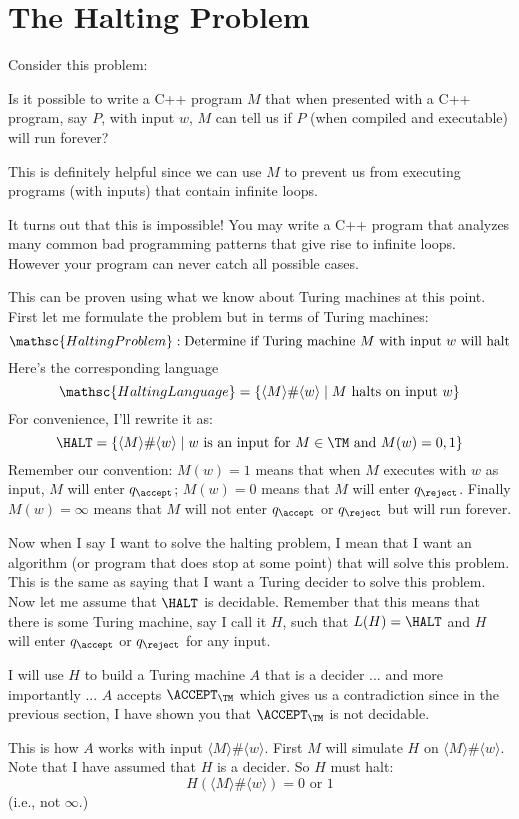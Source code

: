 \section{The Halting Problem}

Consider this problem:

Is it possible to write a C++ program $M$ that when presented with 
a C++ program, say $P$, with input $w$, $M$ can tell us if $P$
(when compiled and executable) will run forever?

This is definitely helpful since we can use $M$ to prevent us from 
executing programs (with inputs) that contain infinite loops.

It turns out that this is impossible!
You may write a C++ program that analyzes many common bad 
programming patterns
that give rise to infinite loops.
However your program can never catch all possible cases.

This can be proven using what we know about Turing machines at this point.
First let me formulate the problem but in terms of Turing machines:
\[
\mathsc{HaltingProblem}
: \text{Determine if Turing machine $M$ with input $w$ will halt}
\]
Here's the corresponding language 
\[
\mathsc{HaltingLanguage} = 
\{
\langle M \rangle \# \langle w \rangle \mid M \text{ halts on input } 
w\}
\]
For convenience, I'll rewrite it as:
\[
\HALT = \{\langle M \rangle \# \langle w \rangle 
\mid 
\text{$w$ is an input for $M \in \TM$ and }
M(w) = 0, 1\}
\]
Remember our convention:
$M(w) = 1$ means that when $M$ executes with $w$ as input, $M$
will enter $q_\accept$;
$M(w) = 0$ means that $M$ will enter $q_\reject$.
Finally $M(w) = \infty$ means that $M$ will not enter $q_\accept$
or $q_\reject$ but will run forever.

Now when I say I want to solve the halting problem, I mean that 
I want an algorithm (or program that does stop at some point)
that will solve this problem.
This is the same as saying that I want a Turing decider to solve
this problem.
Now let me assume that $\HALT$ is decidable.
Remember that this means that there is some Turing machine,
say I call it $H$,
such that $L(H) = \HALT$ and $H$ will 
enter $q_\accept$ or $q_\reject$ for any input.

I will use $H$ to build a Turing machine $A$ that is a decider ...
and more importantly ... $A$ accepts $\ACCEPT_\TM$
which gives us a contradiction since in the previous section,
I have shown you that $\ACCEPT_\TM$ is not decidable.

This is how $A$ works with input $\langle M \rangle \# \langle w \rangle$.
First $M$ will simulate $H$ on 
$\langle M \rangle \# \langle w \rangle$.
Note that I have assumed that $H$ is a decider.
So $H$ must halt:
\[
H(\langle M \rangle \# \langle w \rangle) = 0 \text{ or } 1
\]
(i.e., not $\infty$.)

